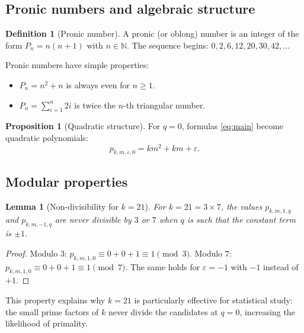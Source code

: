 \documentclass[11pt,a4paper]{article}
\theoremstyle{definition}
\newtheorem{definition}{Definition}[section]
\newtheorem{proposition}{Proposition}[section]
\theoremstyle{plain}
\newtheorem{lemma}{Lemma}[section]
\begin{document}
\subsection{Pronic numbers and algebraic structure}

\begin{definition}[Pronic number]
A pronic (or oblong) number is an integer of the form $P_n = n(n+1)$ with $n \in \mathbb{N}$. The sequence begins: $0, 2, 6, 12, 20, 30, 42, \ldots$
\end{definition}

Pronic numbers have simple properties:
\begin{itemize}[leftmargin=*]
    \item $P_n = n^2 + n$ is always even for $n \geq 1$.
    \item $P_n = \sum_{i=1}^{n} 2i$ is twice the $n$-th triangular number.
\end{itemize}

\begin{proposition}[Quadratic structure]
For $q = 0$, formulas \eqref{eq:main} become quadratic polynomials:
\begin{equation}
p_{k,m,\varepsilon,0} = km^2 + km + \varepsilon.
\end{equation}
\end{proposition}

\subsection{Modular properties}

\begin{lemma}[Non-divisibility for $k=21$]
For $k = 21 = 3 \times 7$, the values $p_{k,m,1,q}$ and $p_{k,m,-1,q}$ are never divisible by $3$ or $7$ when $q$ is such that the constant term is $\pm 1$.
\end{lemma}

\begin{proof}
Modulo $3$: $p_{k,m,1,0} \equiv 0 + 0 + 1 \equiv 1 \pmod{3}$. Modulo $7$: $p_{k,m,1,0} \equiv 0 + 0 + 1 \equiv 1 \pmod{7}$. The same holds for $\varepsilon = -1$ with $-1$ instead of $+1$.
\end{proof}

This property explains why $k = 21$ is particularly effective for statistical study: the small prime factors of $k$ never divide the candidates at $q=0$, increasing the likelihood of primality.

\end{document}
